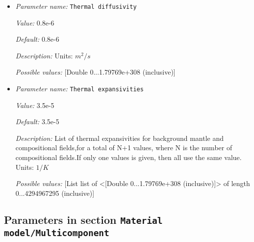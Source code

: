 \begin{itemize}
{\it Value:} 3


{\it Default:} 3


{\it Description:} List of stress exponents, $n_v$, for background mantle and compositional fields,for a total of N+1 values, where N is the number of compositional fields.If only one values is given, then all use the same value.  Units: None


{\it Possible values:} [List list of <[Double 0...1.79769e+308 (inclusive)]> of length 0...4294967295 (inclusive)]
\item {\it Parameter name:} {\tt Thermal diffusivity}
\label{parameters:Material model/Morency and Doin/Thermal diffusivity}


{\it Value:} 0.8e-6


{\it Default:} 0.8e-6


{\it Description:} Units: $m^2/s$


{\it Possible values:} [Double 0...1.79769e+308 (inclusive)]
\item {\it Parameter name:} {\tt Thermal expansivities}
\label{parameters:Material model/Morency and Doin/Thermal expansivities}


{\it Value:} 3.5e-5


{\it Default:} 3.5e-5


{\it Description:} List of thermal expansivities for background mantle and compositional fields,for a total of N+1 values, where N is the number of compositional fields.If only one values is given, then all use the same value.  Units: $1 / K$


{\it Possible values:} [List list of <[Double 0...1.79769e+308 (inclusive)]> of length 0...4294967295 (inclusive)]
\end{itemize}

\subsection{Parameters in section \tt Material model/Multicomponent}
\label{parameters:Material_20model/Multicomponent}

